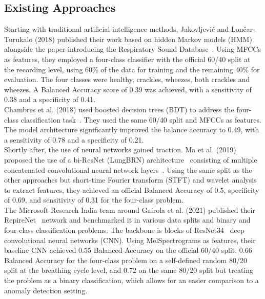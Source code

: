 \subsection{Existing Approaches}
Starting with traditional artificial intelligence methods, Jakovljevi{\'c} and Lon{\v{c}}ar-Turukalo (2018) published their work based on hidden Markov models (HMM) alongside the paper introducing the Respiratory Sound Database~\cite{jakovljevic2018hidden}. Using MFCCs as features, they employed a four-class classifier with the official 60/40 split at the recording level, using 60\% of the data for training and the remaining 40\% for evaluation. The four classes were healthy, crackles, wheezes, both crackles and wheezes. A Balanced Accuracy score of 0.39 was achieved, with a sensitivity of 0.38 and a specificity of 0.41.\\
Chambres et al. (2018) used boosted decision trees (BDT) to address the four-class classification task~\cite{chambres2018automatic}. They used the same 60/40 split and MFCCs as features. The model architecture significantly improved the balance accuracy to 0.49, with a sensitivity of 0.78 and a specificity of 0.21.\\
Shortly after, the use of neural networks gained traction. Ma et al. (2019) proposed the use of a bi-ResNet (LungBRN) architecture~\cite{wang2019bi} consisting of multiple concatenated convolutional neural network layers~\cite{ma2019lungbrn}. Using the same split as the other approaches but short-time Fourier transform (STFT) and wavelet analysis to extract features, they achieved an official Balanced Accuracy of 0.5, specificity of 0.69, and sensitivity of 0.31 for the four-class problem.\\
The Microsoft Research India team around Gairola et al. (2021) published their RepireNet~\cite{gairola2021respirenet} network and benchmarked it in various data splits and binary and four-class classification problems. The backbone is blocks of ResNet34~\cite{he2016deep} deep convolutional neural networks (CNN). Using MelSpectrograms as features, their baseline CNN achieved 0.55 Balanced Accuracy on the official 60/40 split, 0.66 Balanced Accuracy for the four-class problem on a self-defined random 80/20 split at the breathing cycle level, and 0.72 on the same 80/20 split but treating the problem as a binary classification, which allows for an easier comparison to a anomaly detection setting.\\
